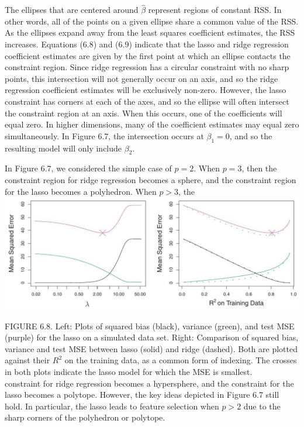 \documentclass[10pt]{article}
\begin{document}
The ellipses that are centered around $\hat{\beta}$ represent regions of constant RSS. In other words, all of the points on a given ellipse share a common value of the RSS. As the ellipses expand away from the least squares coefficient estimates, the RSS increases. Equations (6.8) and (6.9) indicate that the lasso and ridge regression coefficient estimates are given by the first point at which an ellipse contacts the constraint region. Since ridge regression has a circular constraint with no sharp points, this intersection will not generally occur on an axis, and so the ridge regression coefficient estimates will be exclusively non-zero. However, the lasso constraint has corners at each of the axes, and so the ellipse will often intersect the constraint region at an axis. When this occurs, one of the coefficients will equal zero. In higher dimensions, many of the coefficient estimates may equal zero simultaneously. In Figure 6.7, the intersection occurs at $\beta_{1}=0$, and so the resulting model will only include $\beta_{2}$.

In Figure 6.7, we considered the simple case of $p=2$. When $p=3$, then the constraint region for ridge regression becomes a sphere, and the constraint region for the lasso becomes a polyhedron. When $p>3$, the\\
\includegraphics[max width=\textwidth, center]{2025_05_05_efe77898333945044de4g-238}

FIGURE 6.8. Left: Plots of squared bias (black), variance (green), and test MSE (purple) for the lasso on a simulated data set. Right: Comparison of squared bias, variance and test MSE between lasso (solid) and ridge (dashed). Both are plotted against their $R^{2}$ on the training data, as a common form of indexing. The crosses in both plots indicate the lasso model for which the MSE is smallest.\\
constraint for ridge regression becomes a hypersphere, and the constraint for the lasso becomes a polytope. However, the key ideas depicted in Figure 6.7 still hold. In particular, the lasso leads to feature selection when $p>2$ due to the sharp corners of the polyhedron or polytope.
\end{document}
